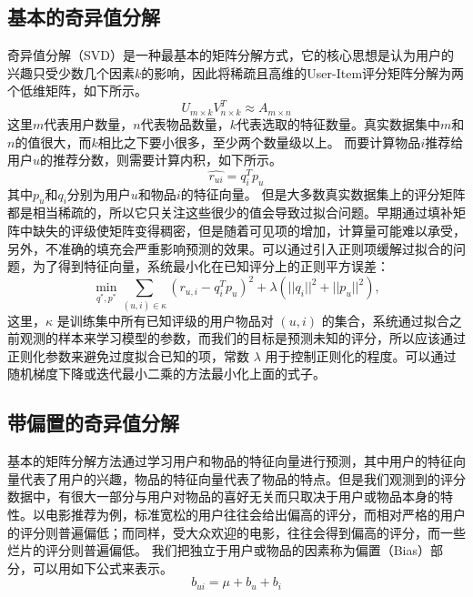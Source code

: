 \subsection{基本的奇异值分解}
奇异值分解（SVD）是一种最基本的矩阵分解方式，它的核心思想是认为用户的兴趣只受少数几个因素$k$的影响，因此将稀疏且高维的User-Item评分矩阵分解为两个低维矩阵，如下所示。
\begin{equation}
U_{m\times k}V_{n\times k}^T \approx A_{m \times n}
\end{equation}
这里$m$代表用户数量，$n$代表物品数量，$k$代表选取的特征数量。真实数据集中$m$和$n$的值很大，而$k$相比之下要小很多，至少两个数量级以上。
而要计算物品$i$推荐给用户$u$的推荐分数，则需要计算内积，如下所示。
\begin{equation}
\hat{r_{ui}} = q_i^Tp_u
\end{equation}
其中$p_u$和$q_i$分别为用户$u$和物品$i$的特征向量。
但是大多数真实数据集上的评分矩阵都是相当稀疏的，所以它只关注这些很少的值会导致过拟合问题。早期通过填补矩阵中缺失的评级使矩阵变得稠密，但是随着可见项的增加，计算量可能难以承受，另外，不准确的填充会严重影响预测的效果。可以通过引入正则项缓解过拟合的问题，为了得到特征向量，系统最小化在已知评分上的正则平方误差：
\begin{equation}
\min_{q^*, p^*} {\sum\limits_{(u,i) \in \kappa} {{(r_{u,i}-q_i^Tp_u)}^2 + \lambda(||q_i||^2 + ||p_u||^2)} } ,
\end{equation}
这里，$\kappa$ 是训练集中所有已知评级的用户物品对 $(u,i)$ 的集合，系统通过拟合之前观测的样本来学习模型的参数，而我们的目标是预测未知的评分，所以应该通过正则化参数来避免过度拟合已知的项，常数 $\lambda$ 用于控制正则化的程度。可以通过随机梯度下降或迭代最小二乘的方法最小化上面的式子。


\subsection{带偏置的奇异值分解}

基本的矩阵分解方法通过学习用户和物品的特征向量进行预测，其中用户的特征向量代表了用户的兴趣，物品的特征向量代表了物品的特点。但是我们观测到的评分数据中，有很大一部分与用户对物品的喜好无关而只取决于用户或物品本身的特性。以电影推荐为例，标准宽松的用户往往会给出偏高的评分，而相对严格的用户的评分则普遍偏低；而同样，受大众欢迎的电影，往往会得到偏高的评分，而一些烂片的评分则普遍偏低。
我们把独立于用户或物品的因素称为偏置（Bias）部分，可以用如下公式来表示。
\begin{equation*}
b_{ui} = \mu + b_u + b_i
\end{equation*}

